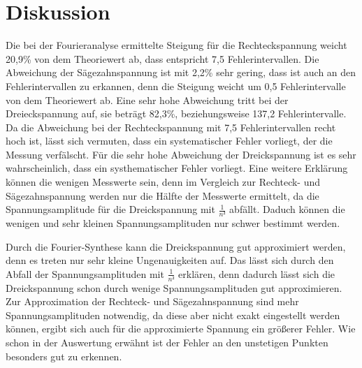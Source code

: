 \section{Diskussion}
Die bei der Fourieranalyse ermittelte Steigung für die Rechteckspannung
weicht 20,9\% von dem Theoriewert ab, dass entspricht 7,5 Fehlerintervallen.
Die Abweichung der Sägezahnspannung ist mit 2,2\% sehr gering, dass ist auch
an den Fehlerintervallen zu erkannen, denn die Steigung weicht um 0,5 Fehlerintervalle
von dem Theoriewert ab. Eine sehr hohe Abweichung tritt bei der Dreieckspannung
auf, sie beträgt 82,3\%, beziehungsweise 137,2 Fehlerintervalle.
Da die Abweichung bei der Rechteckspannung mit 7,5 Fehlerintervallen recht hoch
ist, lässt sich vermuten, dass ein systematischer Fehler vorliegt, der die Messung
verfälscht.
Für die sehr hohe Abweichung der Dreickspannung ist es sehr wahrscheinlich, dass  ein
systhematischer Fehler vorliegt. Eine weitere Erklärung können die wenigen Messwerte
sein, denn im Vergleich zur Rechteck- und Sägezahnspannung werden nur die Hälfte der
Messwerte ermittelt, da die Spannungsamplitude für die Dreickspannung mit $\frac{1}{n²}$ abfällt.
Daduch können die wenigen und sehr kleinen Spannungsamplituden nur schwer bestimmt werden.


Durch die Fourier-Synthese kann die Dreickspannung gut approximiert werden, denn
es treten nur sehr kleine Ungenauigkeiten auf. Das lässt sich durch den Abfall
der Spannungsamplituden mit $\frac{1}{n²}$ erklären, denn dadurch lässt sich die
Dreickspannung schon durch wenige Spannungsamplituden gut approximieren.
Zur Approximation der Rechteck- und Sägezahnspannung sind mehr
Spannungsamplituden notwendig, da diese aber nicht exakt eingestellt werden können,
ergibt sich auch für die approximierte Spannung ein größerer Fehler.
Wie schon in der Auswertung erwähnt ist der Fehler an den unstetigen Punkten
besonders gut zu erkennen.

\label{sec:Diskussion}

